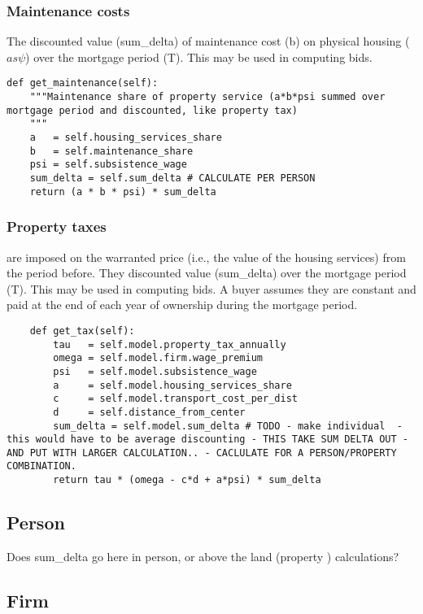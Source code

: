 \subsubsection{Maintenance costs} The discounted value (sum\_delta) of maintenance cost (b) on  physical housing ($as\psi$) over the mortgage period (T). This may be used in computing bids.
\begin{lstlisting}
def get_maintenance(self):
    """Maintenance share of property service (a*b*psi summed over mortgage period and discounted, like property tax)
    """
    a   = self.housing_services_share
    b   = self.maintenance_share
    psi = self.subsistence_wage
    sum_delta = self.sum_delta # CALCULATE PER PERSON
    return (a * b * psi) * sum_delta  
\end{lstlisting}

\subsubsection{Property taxes}
are imposed on the  warranted price (i.e., the value of the housing services) from the period before. They  discounted value (sum\_delta)  over the mortgage period (T). This may be used in computing bids. A buyer assumes they are constant and paid at the end of each year of ownership during the mortgage period.
\begin{lstlisting}
    def get_tax(self):
        tau   = self.model.property_tax_annually
        omega = self.model.firm.wage_premium 
        psi   = self.model.subsistence_wage
        a     = self.model.housing_services_share
        c     = self.model.transport_cost_per_dist
        d     = self.distance_from_center
        sum_delta = self.model.sum_delta # TODO - make individual  - this would have to be average discounting - THIS TAKE SUM DELTA OUT - AND PUT WITH LARGER CALCULATION.. - CACLULATE FOR A PERSON/PROPERTY COMBINATION.
        return tau * (omega - c*d + a*psi) * sum_delta
\end{lstlisting}

\subsection{Person}
Does sum\_delta go here in person, or above the land (property ) calculations?  

\subsection{Firm}

